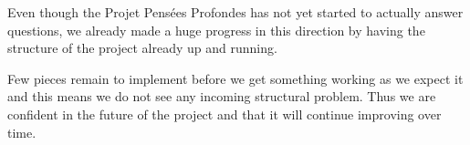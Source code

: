 Even though the Projet Pensées Profondes has not yet started to actually
answer questions, we already made a huge progress in this direction
by having the structure of the project already up and running.

Few pieces remain to implement before we get something working as we
expect it and this means we do not see any incoming structural problem.
Thus we are confident in the future of the project and that it will
continue improving over time.
